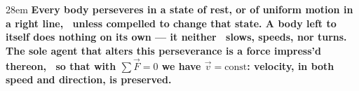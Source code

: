 \documentclass[border=4pt]{standalone}
\begin{document}
\begin{varwidth}{28em}
\large\bfseries
Every body perseveres in \textcolor{rest}{a state of rest}, or of \textcolor{uniform}{uniform motion in a right line}, \     unless compelled to change that state. A body left to itself does nothing on its own — it neither \     slows, speeds, nor turns. The sole agent that alters this perseverance is a \textcolor{force}{force impress'd thereon}, \     so that with $\sum \vec{F} = 0$ we have $\vec{v} = \text{const}$: velocity, in both speed and direction, is preserved.
\end{varwidth}
\end{document}
